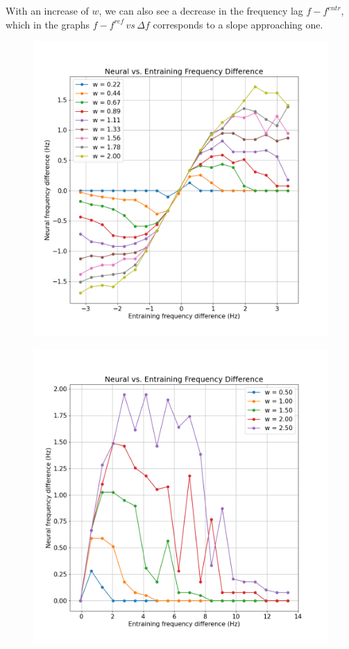 \documentclass{cmc}
\begin{document}
With an increase of $w$, we can also see a decrease in the frequency lag $f-f^{entr}$, which in the graphs $f-f^{ref}\,vs\,\Delta f$ corresponds to a slope approaching one.

\begin{figure}[H]
  \centering
  \begin{minipage}{0.48\textwidth}
    \centering
    \includegraphics[width=\linewidth]{our_figures/exercise8_frequency_diff.png}
    \label{fig:exercise62a}
  \end{minipage}
  \hfill
  \begin{minipage}{0.48\textwidth}
    \centering
    \includegraphics[width=\linewidth]{our_figures/exercise8bis_frequency_diff.png}

\end{minipage}
\end{figure}
\end{document}
